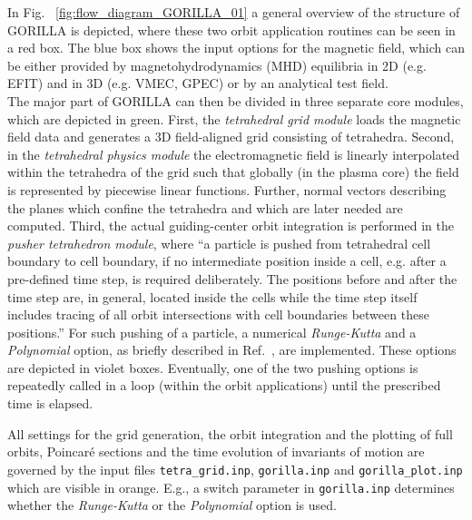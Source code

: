 \documentclass{TheMartianReport}
\begin{document}
In Fig. ~\ref{fig:flow_diagram_GORILLA_01} a general overview of the structure of GORILLA is depicted, where these two orbit application routines can be seen in a red box. 
The blue box shows the input options for the magnetic field, which can be either provided by magnetohydrodynamics (MHD) equilibria in 2D (e.g. EFIT\cite{lao_reconstruction_1985,lao_equilibrium_1990}) and in 3D (e.g. VMEC\cite{hirshman_steepestdescent_1983,hirshman_three-dimensional_1986}, GPEC\cite{park_computation_2007,logan_neoclassical_2013}) or by an analytical test field. \\
%
The major part of GORILLA can then be divided in three separate core modules, which are depicted in green. First, the \textit{tetrahedral grid module} loads the magnetic field data and generates a 3D field-aligned grid consisting of tetrahedra.  
Second, in the \textit{tetrahedral physics module} the electromagnetic field is linearly interpolated within the tetrahedra of the grid such that globally (in the plasma core) the field is represented by piecewise linear functions. Further, normal vectors describing the planes which confine the tetrahedra and which are later needed are computed.  
Third, the actual guiding-center orbit integration is performed in the \textit{pusher tetrahedron module}, where ``a particle is pushed from tetrahedral cell boundary to cell boundary, if no intermediate position inside a cell, e.g. after a pre-defined time step, is required deliberately. The positions before and after the time step are, in general, located inside the cells while the time step itself includes tracing of all orbit intersections with cell boundaries between these positions.''\cite{eder_quasi-geometric_2020} For such pushing of a particle, a numerical \textit{Runge-Kutta} and a \textit{Polynomial} option, as briefly described in Ref.~, are implemented. These options are depicted in violet boxes. Eventually, one of the two pushing options is repeatedly called in a loop (within the orbit applications) until the prescribed time is elapsed. 

All settings for the grid generation, the orbit integration and the plotting of full orbits, Poincaré sections and the time evolution of invariants of motion are governed by the input files \texttt{tetra\_grid.inp}, \texttt{gorilla.inp} and \texttt{gorilla\_plot.inp} which are visible in orange.  E.g., a switch parameter in \texttt{gorilla.inp} determines whether the \textit{Runge-Kutta} or the \textit{Polynomial} option is used.
%
\end{document}
